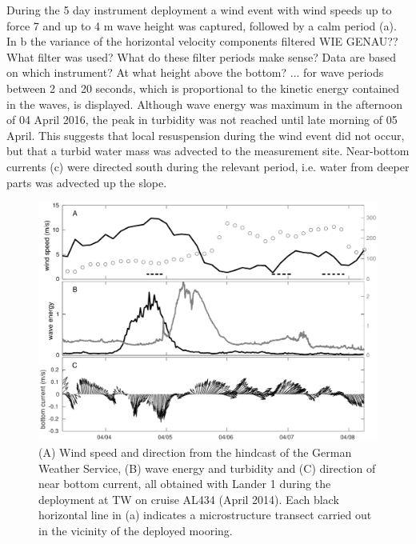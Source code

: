 During the 5 day instrument deployment a wind event with wind 
speeds up to force 7 and up to 4 m wave height was captured, followed by a calm 
period (a). In b the variance of the 
horizontal velocity components filtered WIE GENAU?? What filter was used? What 
do these filter periods make sense? Data are based on which instrument? At what 
height above the bottom? ... for wave periods between 2 and 20 
seconds, which is proportional to the kinetic energy contained in the 
waves, is displayed. Although wave energy was maximum in the afternoon of 
04 April 2016, the peak in turbidity was not reached until late morning of 
05 April. This 
suggests that local resuspension during the wind event did not occur, but that 
a turbid 
water mass was advected to the measurement site. Near-bottom currents 
(c) were directed south during the relevant period, 
i.e. water from deeper parts was advected up the slope.

 \begin{figure}[ht]
\includegraphics[width=15cm]{bilder/al434tw.pdf}
 \caption{(A) Wind speed and direction from the hindcast of the German Weather 
Service, (B) wave energy and turbidity and (C) direction of 
near bottom current, all obtained with Lander 1 during the deployment at TW on 
cruise AL434 (April 2014). Each black horizontal line in (a) indicates a 
microstructure transect carried out in the vicinity of the deployed mooring.}
 \label{tromperwiek}
 \end{figure}
 
